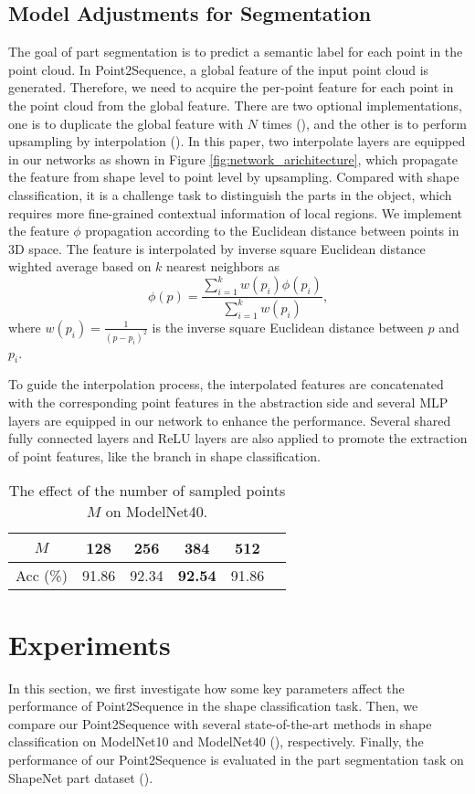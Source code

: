 \documentclass[letterpaper]{article}
\begin{document}
\subsection{Model Adjustments for Segmentation}
The goal of part segmentation is to predict a semantic label for each point in the point cloud.
In Point2Sequence, a global feature of the input point cloud is generated.
Therefore, we need to acquire the per-point feature for each point in the point cloud from the global feature.
There are two optional implementations, one is to duplicate the global feature with $N$ times (\citealt{qi2017pointnet,wang2018dynamic}), and the other is to perform upsampling by interpolation (\citealt{qi2017pointnet++,li2018so}).
In this paper, two interpolate layers are equipped in our networks as shown in Figure \ref{fig:network_arichitecture}, which propagate the feature from shape level to point level by upsampling.
Compared with shape classification, it is a challenge task to distinguish the parts in the object, which requires more fine-grained contextual information of local regions. 
We implement the feature $\phi$ propagation according to the Euclidean distance between points in 3D space.
The feature is interpolated by inverse square Euclidean distance wighted average based on $k$ nearest neighbors as
\begin{equation}
\phi(p) = \frac{\sum_{i=1}^{k}{w(p_i)\phi(p_i)}}{\sum_{i=1}^{k}{w(p_i)}},
\label{equation:interpolate}
\end{equation}
where  $w(p_i)=\frac{1}{(p-p_i)^2}$ is the inverse square Euclidean distance between $p$ and $p_i$.

To guide the interpolation process, the interpolated features are concatenated with the corresponding point features in the abstraction side and several MLP layers are equipped in our network to enhance the performance.
Several shared fully connected layers and ReLU layers are also applied to promote the extraction of point features, like the branch in shape classification.

\begin{table}[tp]
\centering
\caption{The effect of the number of sampled points $M$ on ModelNet40.}
\label{table:sample_points}
\begin{tabular}{cccccc}\hline
$M$&128&256&384&512\\ \hline
Acc (\%)&91.86&92.34&\textbf{92.54}&91.86\\ \hline
\end{tabular}
\end{table}
\section{Experiments}
In this section, we first investigate how some key parameters affect the performance of Point2Sequence in the shape classification task.
Then, we compare our Point2Sequence with several state-of-the-art methods in shape classification on ModelNet10 and ModelNet40 (\citealt{wu20153d}), respectively.
Finally, the performance of our Point2Sequence is evaluated in the part segmentation task on ShapeNet part dataset (\citealt{savva2016shrec}).
\end{document}
